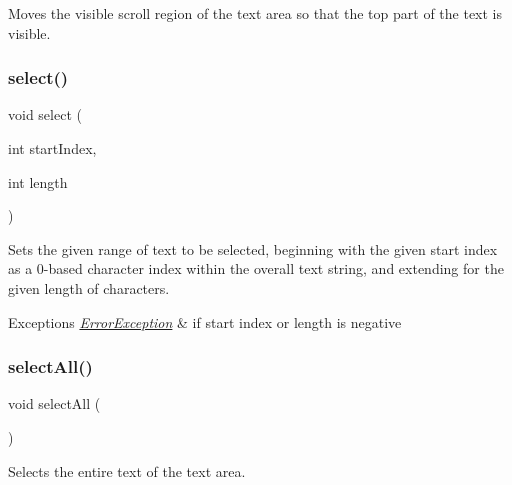 Moves the visible scroll region of the text area so that the top part of the text is visible. 

\mbox{\label{classGTextArea_aaeb1320c0553d0d2b8081b750f59a34a}} 
\subsubsection{\texorpdfstring{select()}{select()}}
{\footnotesize\ttfamily void select (\begin{DoxyParamCaption}\item[{int}]{start\+Index,  }\item[{int}]{length }\end{DoxyParamCaption})\hspace{0.3cm}{\ttfamily [virtual]}}



Sets the given range of text to be selected, beginning with the given start index as a 0-\/based character index within the overall text string, and extending for the given length of characters. 


\begin{DoxyExceptions}{Exceptions}
{\em \mbox{\hyperlink{classErrorException}{Error\+Exception}}} & if start index or length is negative \\
\hline
\end{DoxyExceptions}
\mbox{\label{classGTextArea_ab6658ed404200bd7aaca5629db064645}} 
\subsubsection{\texorpdfstring{select\+All()}{selectAll()}}
{\footnotesize\ttfamily void select\+All (\begin{DoxyParamCaption}{ }\end{DoxyParamCaption})\hspace{0.3cm}{\ttfamily [virtual]}}



Selects the entire text of the text area. 

\mbox{\label{classGInteractor_ad15f102f62e2960576012f1aa0ba4b2e}} 

